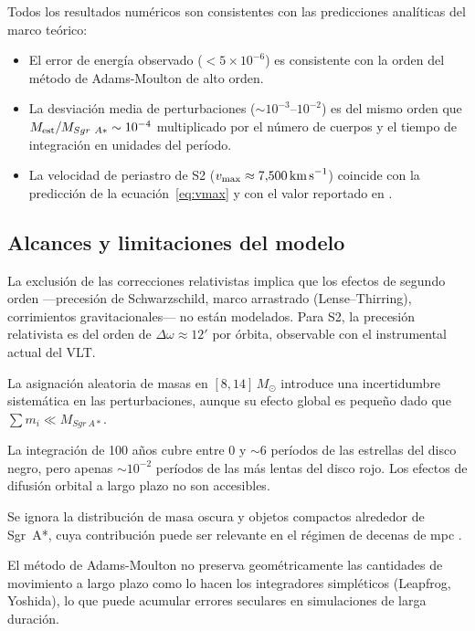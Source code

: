 \documentclass[12pt,a4paper]{article}
\newcommand{\SgrA}{Sgr~A*}
\newcommand{\Msol}{M_{\odot}}
\newcommand{\vmax}{v_{\rm max}}
\begin{document}
Todos los resultados numéricos son consistentes con las predicciones analíticas del
marco teórico:
\begin{itemize}[itemsep=2pt]
  \item El error de energía observado ($< 5 \times 10^{-6}$) es consistente con la
    orden del método de Adams-Moulton de alto orden.
  \item La desviación media de perturbaciones ($\sim 10^{-3}$--$10^{-2}$) es del
    mismo orden que $M_{\rm est}/M_{\SgrA} \sim 10^{-4}$ multiplicado por el número
    de cuerpos y el tiempo de integración en unidades del período.
  \item La velocidad de periastro de S2 ($\vmax \approx 7{,}500\,\text{km\,s}^{-1}$)
    coincide con la predicción de la ecuación~\eqref{eq:vmax} y con el valor
    reportado en \citet{gillessen2017update}.
\end{itemize}

\subsection{Alcances y limitaciones del modelo}
\label{subsec:limitaciones}

\begin{description}[itemsep=3pt]
  \item[Mecánica newtoniana.] La exclusión de las correcciones relativistas
    implica que los efectos de segundo orden —precesión de Schwarzschild, marco
    arrastrado (Lense--Thirring), corrimientos gravitacionales— no están modelados.
    Para S2, la precesión relativista es del orden de
    $\Delta\omega \approx 12'$ por órbita, observable con el instrumental actual del
    VLT.
  \item[Masas estelares estimadas.] La asignación aleatoria de masas en
    $[8, 14]\,\Msol$ introduce una incertidumbre sistemática en las perturbaciones,
    aunque su efecto global es pequeño dado que $\sum m_i \ll M_{\SgrA}$.
  \item[Escala temporal limitada.] La integración de 100 años cubre entre 0 y $\sim 6$
    períodos de las estrellas del disco negro, pero apenas $\sim 10^{-2}$ períodos de
    las más lentas del disco rojo.  Los efectos de difusión orbital a largo plazo no
    son accesibles.
  \item[Masa extendida omitida.] Se ignora la distribución de masa oscura y objetos
    compactos alrededor de \SgrA{}, cuya contribución puede ser relevante en el
    régimen de decenas de mpc \citep{ciurlo2025sagittarius}.
  \item[Integrador no simpléctico.] El método de Adams-Moulton no preserva
    geométricamente las cantidades de movimiento a largo plazo como lo hacen los
    integradores simpléticos (Leapfrog, Yoshida), lo que puede acumular errores
    seculares en simulaciones de larga duración.
\end{description}
\end{document}
